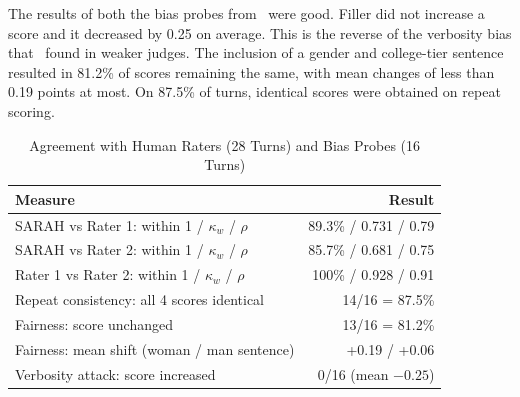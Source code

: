 \documentclass[conference]{IEEEtran}
\begin{document}
The results of both the bias probes from~\cite{zheng2023} were good. Filler did not increase a score and it decreased by 0.25 on average. This is the reverse of the verbosity bias that~\cite{zheng2023} found in weaker judges. The inclusion of a gender and college-tier sentence resulted in 81.2\% of scores remaining the same, with mean changes of less than 0.19 points at most. On 87.5\% of turns, identical scores were obtained on repeat scoring.

\begin{table}[t]
\caption{Agreement with Human Raters (28 Turns) and Bias Probes (16 Turns)}
\label{tab:agree}
\centering
\small
\begin{tabularx}{\columnwidth}{@{}X r@{}}
\toprule
\textbf{Measure} & \textbf{Result} \\
\midrule
SARAH vs Rater 1: within 1 / $\kappa_w$ / $\rho$ & 89.3\% / 0.731 / 0.79 \\
SARAH vs Rater 2: within 1 / $\kappa_w$ / $\rho$ & 85.7\% / 0.681 / 0.75 \\
Rater 1 vs Rater 2: within 1 / $\kappa_w$ / $\rho$ & 100\% / 0.928 / 0.91 \\
\midrule
Repeat consistency: all 4 scores identical & 14/16 = 87.5\% \\
Fairness: score unchanged & 13/16 = 81.2\% \\
Fairness: mean shift (woman / man sentence) & +0.19 / +0.06 \\
Verbosity attack: score increased & 0/16 (mean $-0.25$) \\
\bottomrule
\end{tabularx}
\end{table}
\end{document}
